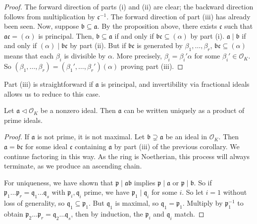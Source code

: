 \begin{proof}
    The forward direction of parts (i) and (ii) are clear; the backward direction follows from multiplication by \( \mathfrak c^{-1} \).
    The forward direction of part (iii) has already been seen.
    Now, suppose \( \mathfrak b \subseteq \mathfrak a \).
    By the proposition above, there exists \( \mathfrak c \) such that \( \mathfrak a \mathfrak c = (\alpha) \) is principal.
    Then, \( \mathfrak b \subseteq \mathfrak a \) if and only if \( \mathfrak b \mathfrak c \subseteq (\alpha) \) by part (i).
    \( \mathfrak a \mid \mathfrak b \) if and only if \( (\alpha) \mid \mathfrak b \mathfrak c \) by part (ii).
    But if \( \mathfrak b \mathfrak c \) is generated by \( \beta_1, \dots, \beta_r \), \( \mathfrak b \mathfrak c \subseteq (\alpha) \) means that each \( \beta_i \) is divisible by \( \alpha \).
    More precisely, \( \beta_i = \beta_i' \alpha \) for some \( \beta_i' \in \mathcal O_K \).
    So \( (\beta_1, \dots, \beta_r) = (\beta_1', \dots, \beta_r') (\alpha) \) proving part (iii).
\end{proof}
\begin{remark}
    Part (iii) is straightforward if \( \mathfrak a \) is principal, and invertibility via fractional ideals allows us to reduce to this case.
\end{remark}
\begin{theorem}
    Let \( \mathfrak a \triangleleft \mathcal O_K \) be a nonzero ideal.
    Then \( \mathfrak a \) can be written uniquely as a product of prime ideals.
\end{theorem}
\begin{proof}
    If \( \mathfrak a \) is not prime, it is not maximal.
    Let \( \mathfrak b \supsetneq \mathfrak a \) be an ideal in \( \mathcal O_K \).
    Then \( \mathfrak a = \mathfrak b \mathfrak c \) for some ideal \( \mathfrak c \) containing \( \mathfrak a \) by part (iii) of the previous corollary.
    We continue factoring in this way.
    As the ring is Noetherian, this process will always terminate, as we produce an ascending chain.

    For uniqueness, we have shown that \( \mathfrak p \mid \mathfrak a \mathfrak b \) implies \( \mathfrak p \mid \mathfrak a \) or \( \mathfrak p \mid \mathfrak b \).
    So if \( \mathfrak p_1 \dots \mathfrak p_r = \mathfrak q_1 \dots \mathfrak q_s \) with \( \mathfrak p_i, \mathfrak q_i \) prime, we have \( \mathfrak p_1 \mid \mathfrak q_i \) for some \( i \).
    So let \( i = 1 \) without loss of generality, so \( \mathfrak q_1 \subseteq \mathfrak p_1 \).
    But \( \mathfrak q_1 \) is maximal, so \( \mathfrak q_1 = \mathfrak p_1 \).
    Multiply by \( \mathfrak p_1^{-1} \) to obtain \( \mathfrak p_2 \dots \mathfrak p_r = \mathfrak q_2 \dots \mathfrak q_s \), then by induction, the \( \mathfrak p_i \) and \( \mathfrak q_i \) match.
\end{proof}
